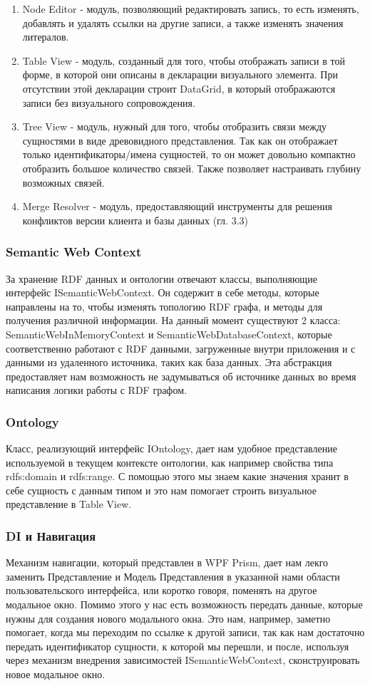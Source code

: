 \documentclass[12pt]{article}
\begin{document}
\begin{enumerate}
    \item Node Editor - модуль, позволяющий редактировать запись, то есть изменять, добавлять и удалять ссылки на другие записи, а также изменять значения литералов.
    \item Table View - модуль, созданный для того, чтобы отображать записи в той форме, в которой они описаны в декларации визуального элемента. При отсутствии этой декларации строит DataGrid, в который отображаются записи без визуального сопровождения.
    \item Tree View - модуль, нужный для того, чтобы отобразить связи между сущностями в виде древовидного представления. Так как он отображает только идентификаторы/имена сущностей, то он может довольно компактно отобразить большое количество связей. Также позволяет настраивать глубину возможных связей.
    \item Merge Resolver - модуль, предоставляющий инструменты для решения конфликтов версии клиента и базы данных (гл. 3.3)
\end{enumerate}

\subsubsection{Semantic Web Context}
\qquad За хранение RDF данных и онтологии отвечают классы, выполняющие интерфейс ISemanticWebContext. Он содержит в себе методы, которые направлены на то, чтобы изменять топологию RDF графа, и методы для получения различной информации. На данный момент существуют 2 класса: SemanticWebInMemoryContext и SemanticWebDatabaseContext, которые соответственно работают с RDF данными, загруженные внутри приложения и с данными из удаленного источника, таких как база данных. Эта абстракция предоставляет нам возможность не задумываться об источнике данных во время написания логики работы с RDF графом.

\subsubsection{Ontology}
\qquad Класс, реализующий интерфейс IOntology, дает нам удобное представление используемой в текущем контексте онтологии, как например свойства типа rdfs:domain и rdfs:range. С помощью этого мы знаем какие значения хранит в себе сущность с данным типом и это нам помогает строить визуальное представление в Table View.

\subsubsection{DI и Навигация}
Механизм навигации, который представлен в WPF Prism, дает нам лекго заменить Представление и Модель Представления в указанной нами области пользовательского интерфейса, или коротко говоря, поменять на другое модальное окно. Помимо этого у нас есть возможность передать данные, которые нужны для создания нового модального окна. Это нам, например, заметно помогает, когда мы переходим по ссылке к другой записи, так как нам достаточно передать идентификатор сущности, к которой мы перешли, и после, используя через механизм внедрения зависимостей ISemanticWebContext, сконструировать новое модальное окно.
\end{document}
